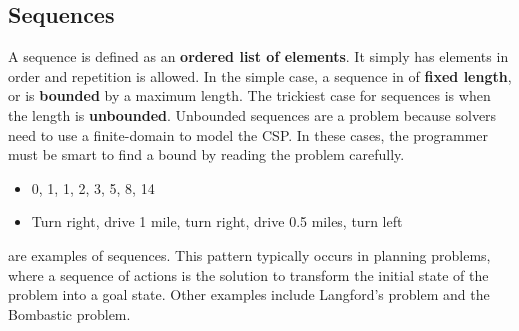 \documentclass[CS4402-Notes.tex]{subfiles}
\begin{document}
\subsection{Sequences}
A sequence is defined as an \textbf{ordered list of elements}. It simply has elements in order and repetition is allowed. In the simple case, a sequence in of \textbf{fixed length}, or is \textbf{bounded} by a maximum length. The trickiest case for sequences is when the length is \textbf{unbounded}. Unbounded sequences are a problem because solvers need to use a finite-domain to model the CSP. In these cases, the programmer must be smart to find a bound by reading the problem carefully.
\begin{itemize}
\item 0, 1, 1, 2, 3, 5, 8, 14
\item Turn right, drive 1 mile, turn right, drive 0.5 miles, turn left
\end{itemize}
are examples of sequences. This pattern typically occurs in planning problems, where a sequence of actions is the solution to transform the initial state of the problem into a goal state. Other examples include Langford's problem and the Bombastic problem.
\end{document}
